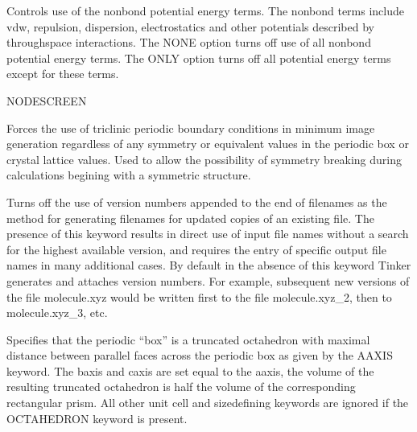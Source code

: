 \documentclass[letterpaper,11pt,english]{sphinxmanual}
\begin{document}
\ignorespaces {}\label{\detokenize{text/keywords:key-nonbondterm}}\begin{description}
\sphinxAtStartPar
Controls use of the nonbond potential energy terms. The nonbond terms include vdw, repulsion, dispersion, electrostatics and other potentials described by through\sphinxhyphen{}space interactions. The NONE option turns off use of all nonbond potential energy terms. The ONLY option turns off all potential energy terms except for these terms.

\end{description}

\ignorespaces {}\label{\detokenize{text/keywords:key-nodescreen}}
\sphinxAtStartPar
NODESCREEN

\ignorespaces {}\label{\detokenize{text/keywords:key-nosymmetry}}\begin{description}
\sphinxAtStartPar
Forces the use of triclinic periodic boundary conditions in minimum image generation regardless of any symmetry or equivalent values in the periodic box or crystal lattice values. Used to allow the possibility of symmetry breaking during calculations begining with a symmetric structure.

\end{description}

\ignorespaces {}\label{\detokenize{text/keywords:key-noversion}}\begin{description}
\sphinxAtStartPar
Turns off the use of version numbers appended to the end of filenames as the method for generating filenames for updated copies of an existing file. The presence of this keyword results in direct use of input file names without a search for the highest available version, and requires the entry of specific output file names in many additional cases. By default in the absence of this keyword Tinker generates and attaches version numbers. For example, subsequent new versions of the file molecule.xyz would be written first to the file molecule.xyz\_2, then to molecule.xyz\_3, etc.

\end{description}

\ignorespaces {}\label{\detokenize{text/keywords:key-octahedron}}\begin{description}
\sphinxAtStartPar
Specifies that the periodic “box” is a truncated octahedron with maximal distance between parallel faces across the periodic box as given by the A\sphinxhyphen{}AXIS keyword. The b\sphinxhyphen{}axis and c\sphinxhyphen{}axis are set equal to the a\sphinxhyphen{}axis, the volume of the resulting truncated octahedron is half the volume of the corresponding rectangular prism. All other unit cell and size\sphinxhyphen{}defining keywords are ignored if the OCTAHEDRON keyword is present.

\end{description}
\end{document}
